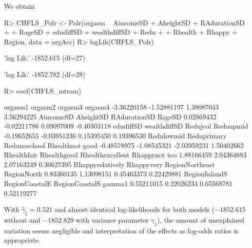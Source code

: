 \documentclass[article,nojss,shortnames]{jss}\usepackage[]{graphicx}\usepackage[]{xcolor}
\begin{document}
We obtain
\begin{Schunk}
\begin{Sinput}
R> CHFLS_Polr <- Polr(orgasm ~ AincomeSD + AheightSD + RAdurationSD + 
+                     RageSD + edudiffSD + wealthdiffSD + Redu + 
+                     Rhealth + Rhappy + Region, data = orgAcc)
R> logLik(CHFLS_Polr)
\end{Sinput}
\begin{Soutput}
'log Lik.' -1852.615 (df=27)
\end{Soutput}
\begin{Soutput}
'log Lik.' -1852.782 (df=28)
\end{Soutput}
\begin{Sinput}
R> coef(CHFLS_mtram)
\end{Sinput}
\begin{Soutput}
         orgasm1          orgasm2          orgasm3          orgasm4 
     -3.36220158      -1.52881197       1.38087043       3.56294225 
       AincomeSD        AheightSD     RAdurationSD           RageSD 
      0.02869432      -0.02211786       0.09097009      -0.40303118 
       edudiffSD     wealthdiffSD         Redujcol        Reduupmid 
     -0.19652655      -0.03951236       0.15395450       0.19396530 
      Redulowmid      Reduprimary     Redunoschool  Rhealthnot good 
     -0.48578975      -1.08545321      -2.03959231       1.50402662 
     Rhealthfair      Rhealthgood Rhealthexcellent    Rhappynot too 
      1.88166459       2.04364883       2.07163249       0.30627395 
Rhappyrelatively       Rhappyvery  RegionNortheast      RegionNorth 
      0.83360135       1.13098151       0.45463373       0.22429881 
   RegionInlandS   RegionCoastalE   RegionCoastalS           gamma1 
      0.55211015       0.22026234       0.65568781       0.52119277 
\end{Soutput}
\end{Schunk}

With $\hat{\gamma}_1 = 0.521$ 
and almost identical log-likelihoods for both models ($-1852.615$ without
and $-1852.829$ with variance parameter $\gamma_1$), the amount of
unexplained variation seems negligible and interpretation of the effects
as log-odds ratios is appropriate.
\end{document}

